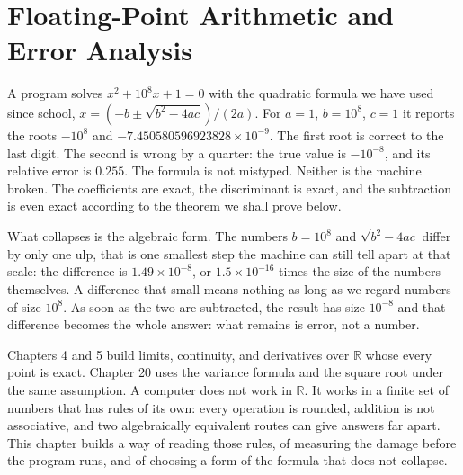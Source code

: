 \chapter{Floating-Point Arithmetic and Error Analysis}

A program solves $x^{2}+10^{8}x+1=0$ with the quadratic formula we have used since
school, $x=(-b\pm\sqrt{b^{2}-4ac})/(2a)$. For $a=1$, $b=10^{8}$, $c=1$ it reports
the roots $-10^{8}$ and $-7.450580596923828\times10^{-9}$. The first root is correct
to the last digit. The second is wrong by a quarter: the true value is $-10^{-8}$, and
its relative error is $0.255$. The formula is not mistyped. Neither is
the machine broken. The coefficients are exact, the discriminant is exact, and the
subtraction is even exact according to the theorem we shall prove below.

What collapses is the algebraic form. The numbers $b=10^{8}$ and $\sqrt{b^{2}-4ac}$
differ by only one ulp, that is one smallest step the machine can still tell apart at
that scale: the difference is $1.49\times10^{-8}$, or $1.5\times10^{-16}$ times the
size of the numbers themselves. A difference that small means nothing as long as we
regard numbers of size $10^{8}$. As soon as the two are subtracted, the result has
size $10^{-8}$ and that difference becomes the whole answer: what remains is error,
not a number.

Chapters 4 and 5 build limits, continuity, and derivatives over $\mathbb{R}$ whose
every point is exact. Chapter 20 uses the variance formula and the square root under
the same assumption. A computer does not work in $\mathbb{R}$. It works in a finite
set of numbers that has rules of its own: every operation is rounded, addition is not
associative, and two algebraically equivalent routes can give answers far apart. This
chapter builds a way of reading those rules, of measuring the damage before the program
runs, and of choosing a form of the formula that does not collapse.

